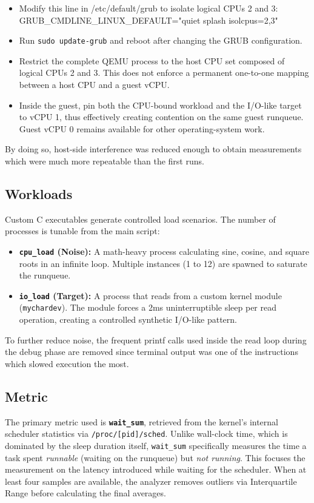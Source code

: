 \documentclass[11pt, a4paper]{article}
\begin{document}
\begin{itemize}
    \item Modify this line in /etc/default/grub to isolate logical CPUs 2 and 3: \\
          GRUB\_CMDLINE\_LINUX\_DEFAULT="quiet splash isolcpus=2,3"
    \item Run \texttt{sudo update-grub} and reboot after changing the GRUB configuration.
    \item Restrict the complete QEMU process to the host CPU set composed of logical CPUs 2 and 3. This does not enforce a permanent one-to-one mapping between a host CPU and a guest vCPU.
    \item Inside the guest, pin both the CPU-bound workload and the I/O-like target to vCPU 1, thus effectively creating contention on the same guest runqueue. Guest vCPU 0 remains available for other operating-system work.
\end{itemize}

By doing so, host-side interference was reduced enough to obtain measurements which were much more repeatable than the first runs.

\subsection{Workloads}
Custom C executables generate controlled load scenarios. The number of processes is tunable from the main  script:
\begin{itemize}
    \item \textbf{\texttt{cpu\_load} (Noise):} A math-heavy process calculating sine, cosine, and square roots in an infinite loop. Multiple instances (1 to 12) are spawned to saturate the runqueue.
    \item \textbf{\texttt{io\_load} (Target):} A process that reads from a custom kernel module (\texttt{mychardev}). The module forces a 2ms uninterruptible sleep per read operation, creating a controlled synthetic I/O-like pattern.
\end{itemize}

To further reduce noise, the frequent printf calls used inside the read loop during the debug phase are removed since terminal output was one of the instructions which slowed execution the most.

\subsection{Metric}
The primary metric used is \textbf{\texttt{wait\_sum}}, retrieved from the kernel's internal scheduler statistics via \texttt{/proc/[pid]/sched}. 
Unlike wall-clock time, which is dominated by the sleep duration itself, \texttt{wait\_sum} specifically measures the time a task spent \textit{runnable} (waiting on the runqueue) 
but \textit{not running}. This focuses the measurement on the latency introduced while waiting for the scheduler.
When at least four samples are available, the analyzer removes outliers via Interquartile Range before calculating the final averages.
\end{document}
